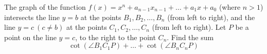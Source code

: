 The graph of the function $f(x)=x^n+a_{n-1}x_{n-1}+\ldots +a_1x+a_0$ (where $n>1$) intersects the line $y=b$ at the points $B_1,B_2,\ldots ,B_n$ (from left to right), and the line $y=c\ (c\not= b)$ at the points $C_1,C_2,\ldots ,C_n$ (from left to right). Let $P$ be a point on the line $y=c$,  to the right to the point $C_n$. Find the sum\[\cot (\angle B_1C_1P)+\ldots +\cot (\angle B_nC_nP) \]